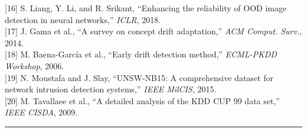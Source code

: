 \documentclass[
  conference]{IEEEtran}
\begin{document}
{[}16{]} S. Liang, Y. Li, and R. Srikant, ``Enhancing the reliability of
OOD image detection in neural networks,'' \emph{ICLR}, 2018.\\
{[}17{]} J. Gama et al., ``A survey on concept drift adaptation,''
\emph{ACM Comput. Surv.}, 2014.\\
{[}18{]} M. Baena-García et al., ``Early drift detection method,''
\emph{ECML-PKDD Workshop}, 2006.\\
{[}19{]} N. Moustafa and J. Slay, ``UNSW-NB15: A comprehensive dataset
for network intrusion detection systems,'' \emph{IEEE MilCIS}, 2015.\\
{[}20{]} M. Tavallaee et al., ``A detailed analysis of the KDD CUP 99
data set,'' \emph{IEEE CISDA}, 2009.

\begin{center}\rule{0.5\linewidth}{0.5pt}\end{center}
\end{document}
